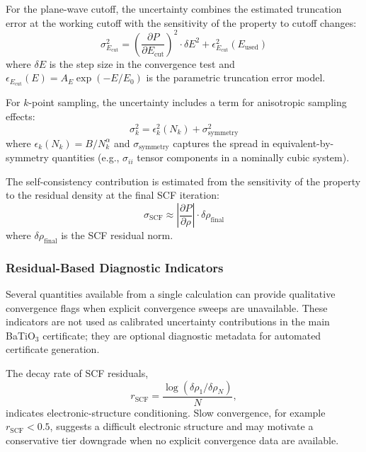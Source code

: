 \documentclass[onecolumn,superscriptaddress,amsmath,amssymb,longbibliography]{revtex4-2}
\newcommand{\Ecut}{E_{\mathrm{cut}}}
\newcommand{\Nk}{N_k}
\begin{document}
For the plane-wave cutoff, the uncertainty combines the estimated truncation
error at the working cutoff with the sensitivity of the property to cutoff
changes:
\begin{equation}
    \sigma_{\Ecut}^2 = \left(\frac{\partial P}{\partial \Ecut}\right)^2
    \cdot \delta E^2 + \epsilon_{\Ecut}^2(E_{\mathrm{used}})
\end{equation}
where $\delta E$ is the step size in the convergence test and
$\epsilon_{\Ecut}(E) = A_E \exp(-E/E_0)$ is the parametric truncation error
model.

For $k$-point sampling, the uncertainty includes a term for anisotropic
sampling effects:
\begin{equation}
    \sigma_k^2 = \epsilon_k^2(\Nk) + \sigma_{\mathrm{symmetry}}^2
\end{equation}
where $\epsilon_k(\Nk) = B/\Nk^\alpha$ and
$\sigma_{\mathrm{symmetry}}$ captures the spread in equivalent-by-symmetry
quantities (e.g., $\sigma_{ii}$ tensor components in a nominally cubic system).

The self-consistency contribution is estimated from the sensitivity of the
property to the residual density at the final SCF iteration:
\begin{equation}
    \sigma_{\mathrm{SCF}} \approx \left|\frac{\partial P}{\partial \rho}\right|
    \cdot \delta\rho_{\mathrm{final}}
\end{equation}
where $\delta\rho_{\mathrm{final}}$ is the SCF residual norm.

\subsubsection*{Residual-Based Diagnostic Indicators}

Several quantities available from a single calculation can provide qualitative
convergence flags when explicit convergence sweeps are unavailable. These
indicators are not used as calibrated uncertainty contributions in the main
BaTiO$_3$ certificate; they are optional diagnostic metadata for automated
certificate generation.

The decay rate of SCF residuals,
\begin{equation}
    r_{\mathrm{SCF}} = \frac{\log(\delta\rho_1 / \delta\rho_N)}{N},
    \label{eq:si_scf_rate}
\end{equation}
indicates electronic-structure conditioning. Slow convergence, for example
$r_{\mathrm{SCF}} < 0.5$, suggests a difficult electronic structure and may
motivate a conservative tier downgrade when no explicit convergence data are
available.
\end{document}
